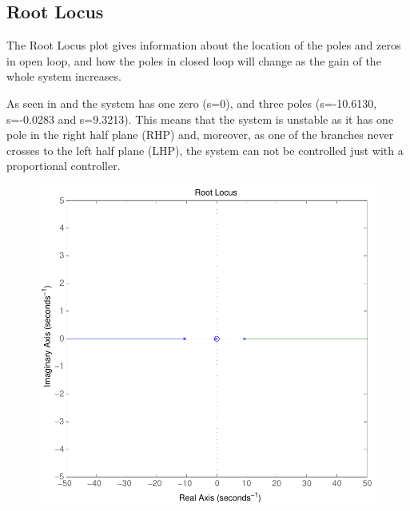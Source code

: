 \subsection{Root Locus}
The Root Locus plot gives information about the location of the poles and zeros in open loop, and how the poles in closed loop will change as the gain of the whole system increases.

As seen in  and  the system has one zero (s=0), and three poles (s=-10.6130, s=-0.0283 and s=9.3213). This means that the system is unstable as it has one pole in the right half plane (RHP) and, moreover, as one of the branches never crosses to the left half plane (LHP), the system can not be controlled just with a proportional controller.

\begin{minipage}{\linewidth}
	\begin{minipage}{0.53\linewidth}
		\begin{figure}[H]
			\includegraphics[scale=.4]{figures/rlocusCubli}
			\label{rlocusCubli}
		\end{figure}\vspace{-5mm}
	\end{minipage}
	\hspace{0.03\linewidth}
	\begin{minipage}{0.53\linewidth}

\end{minipage}
\end{minipage}
